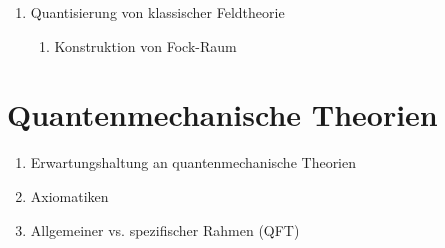 \documentclass[10pt, letterpaper]{article}
\begin{document}
\begin{enumerate}
\begin{enumerate}
  \item Lie Theorie in QM
  \item SRT und Kovarainzbedingungen an Theorien
  \begin{enumerate}
    \item SRT
    \item Lorentzgruppe und Poincare Gruppe
    \item Konzept der Kovarianz von Theorien
    \item Interpretation von Lorentztransformationen
  \end{enumerate}
  \end{enumerate}
  \item Quantisierung von klassischer Feldtheorie
  \begin{enumerate}
    \item Konstruktion von Fock-Raum
  \end{enumerate}
\end{enumerate}

\pagebreak


\section{Quantenmechanische Theorien}

\begin{enumerate}
  \item Erwartungshaltung an quantenmechanische Theorien
  \item Axiomatiken
  \item Allgemeiner vs. spezifischer Rahmen (QFT)
\end{enumerate}
\end{document}
